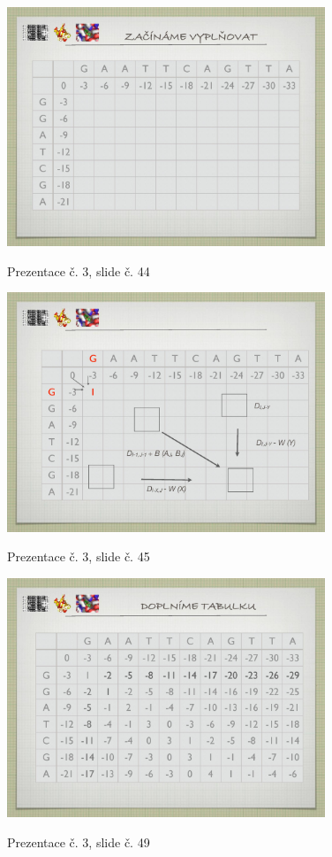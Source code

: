 \documentclass[DIV=8]{scrreprt}
\begin{document}
\begin{figure}
    \caption{Prezentace č. 3, slide č. 44}
    \includegraphics[width=0.85\textwidth]{slides-3/slide-44.jpg}
    \centering
    \label{slides-3-slide-44}
\end{figure}
\begin{figure}
    \caption{Prezentace č. 3, slide č. 45}
    \includegraphics[width=0.85\textwidth]{slides-3/slide-45.jpg}
    \centering
    \label{slides-3-slide-45}
\end{figure}
\begin{figure}
    \caption{Prezentace č. 3, slide č. 49}
    \includegraphics[width=0.85\textwidth]{slides-3/slide-49.jpg}
    \centering
    \label{slides-3-slide-49}
\end{figure}
\end{document}

